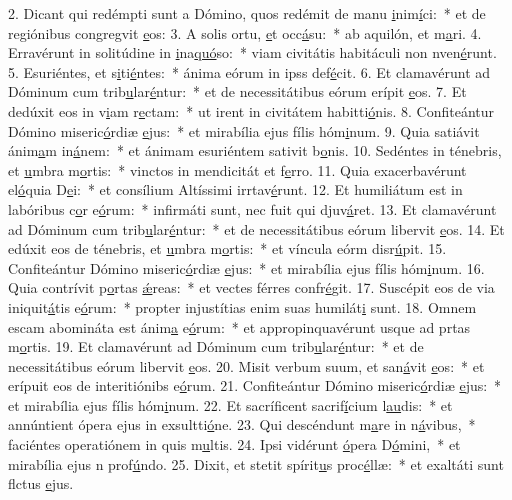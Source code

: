 2. Dicant qui redémpti sunt a Dómino, quos redémit de manu \uline{i}nim\uline{í}ci:~* et de regiónibus congregvit \uline{e}os:
3. A solis ortu, \uline{e}t occ\uline{á}su:~* ab aquilón, et m\uline{a}ri.
4. Erravérunt in solitúdine in \uline{i}na\uline{quó}so:~* viam civitátis habitáculi non nven\uline{é}runt.
5. Esuriéntes, et s\uline{i}ti\uline{é}ntes:~* ánima eórum in ipss def\uline{é}cit.
6. Et clamavérunt ad Dóminum cum trib\uline{u}lar\uline{é}ntur:~* et de necessitátibus eórum erípit \uline{e}os.
7. Et dedúxit eos in v\uline{i}am r\uline{e}ctam:~* ut irent in civitátem habitti\uline{ó}nis.
8. Confiteántur Dómino miseric\uline{ó}rdiæ \uline{e}jus:~* et mirabília ejus fílis hóm\uline{i}num.
9. Quia satiávit ánim\uline{a}m in\uline{á}nem:~* et ánimam esuriéntem sativit b\uline{o}nis.
10. Sedéntes in ténebris, et \uline{u}mbra m\uline{o}rtis:~* vinctos in mendicitát et f\uline{e}rro.
11. Quia exacerbavérunt el\uline{ó}quia D\uline{e}i:~* et consílium Altíssimi irrtav\uline{é}runt.
12. Et humiliátum est in labóribus c\uline{o}r e\uline{ó}rum:~* infirmáti sunt, nec fuit qui djuv\uline{á}ret.
13. Et clamavérunt ad Dóminum cum trib\uline{u}lar\uline{é}ntur:~* et de necessitátibus eórum libervit \uline{e}os.
14. Et edúxit eos de ténebris, et \uline{u}mbra m\uline{o}rtis:~* et víncula eórm disr\uline{ú}pit.
15. Confiteántur Dómino miseric\uline{ó}rdiæ \uline{e}jus:~* et mirabília ejus fílis hóm\uline{i}num.
16. Quia contrívit p\uline{o}rtas \uline{ǽ}reas:~* et vectes férres confr\uline{é}git.
17. Suscépit eos de via iniquit\uline{á}tis e\uline{ó}rum:~* propter injustítias enim suas humilát\uline{i} sunt.
18. Omnem escam abomináta est ánim\uline{a} e\uline{ó}rum:~* et appropinquavérunt usque ad prtas m\uline{o}rtis.
19. Et clamavérunt ad Dóminum cum trib\uline{u}lar\uline{é}ntur:~* et de necessitátibus eórum libervit \uline{e}os.
20. Misit verbum suum, et san\uline{á}vit \uline{e}os:~* et erípuit eos de interitiónibs e\uline{ó}rum.
21. Confiteántur Dómino miseric\uline{ó}rdiæ \uline{e}jus:~* et mirabília ejus fílis hóm\uline{i}num.
22. Et sacríficent sacrif\uline{í}cium l\uline{au}dis:~* et annúntient ópera ejus in exsultti\uline{ó}ne.
23. Qui descéndunt m\uline{a}re in n\uline{á}vibus,~* faciéntes operatiónem in quis m\uline{u}ltis.
24. Ipsi vidérunt \uline{ó}pera D\uline{ó}mini,~* et mirabília ejus n prof\uline{ú}ndo.
25. Dixit, et stetit spírit\uline{u}s proc\uline{é}llæ:~* et exaltáti sunt flctus \uline{e}jus.
